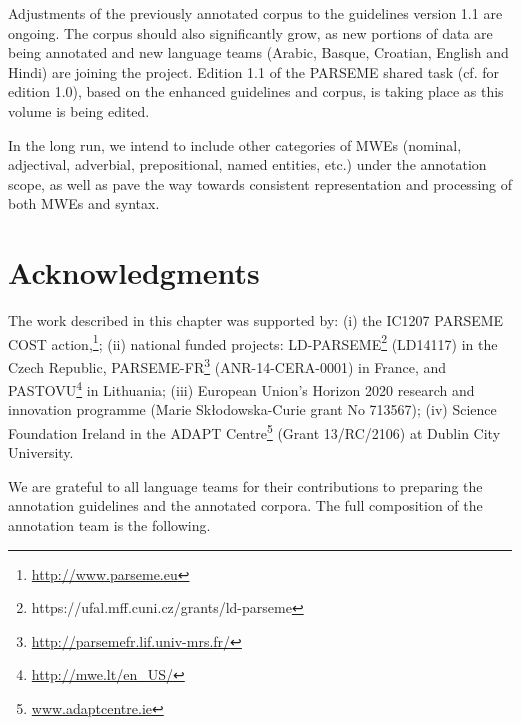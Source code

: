 \documentclass[output=paper,
modfonts,
]{langscibook}
\begin{document}
Adjustments of the previously annotated corpus to the guidelines version 1.1 are ongoing. 
The corpus should also significantly grow, as new portions of data are being annotated and new language teams (Arabic, Basque, Croatian, English and Hindi) 
are joining the project. Edition 1.1 of the PARSEME shared task (cf. \citealt{MWEWorkshop} for edition 1.0), based on the enhanced guidelines and corpus, is taking place as this volume is being edited. 

In the long run, we intend to include other categories of MWEs (nominal, adjectival, adverbial, prepositional, named entities, etc.) under the annotation scope, as well as pave the way towards consistent representation and processing of both MWEs and syntax. 

\section*{Acknowledgments}
%

The work described in this chapter was supported by: (i) the IC1207 PARSEME COST action,\footnote{\url{http://www.parseme.eu}}; 
(ii) national funded projects: LD-PARSEME\footnote{https://ufal.mff.cuni.cz/grants/ld-parseme} (LD14117) in the Czech Republic, PARSEME-FR\footnote{\url{http://parsemefr.lif.univ-mrs.fr/}} (ANR-14-CERA-0001) in France, and PAS\-TO\-VU\footnote{\url{http://mwe.lt/en_US/}} in Lithuania;
(iii) European Union’s Horizon 2020 research and innovation programme (Marie Skłodowska-Curie grant No 713567); (iv) Science Foundation Ireland in the ADAPT Centre\footnote{\url{www.adaptcentre.ie}} (Grant 13/RC/2106) at Dublin City University.

We are grateful to all language teams for their contributions to preparing the annotation guidelines and the annotated corpora. The full composition of the annotation team is the following.\vspace{0.3cm}
\end{document}
